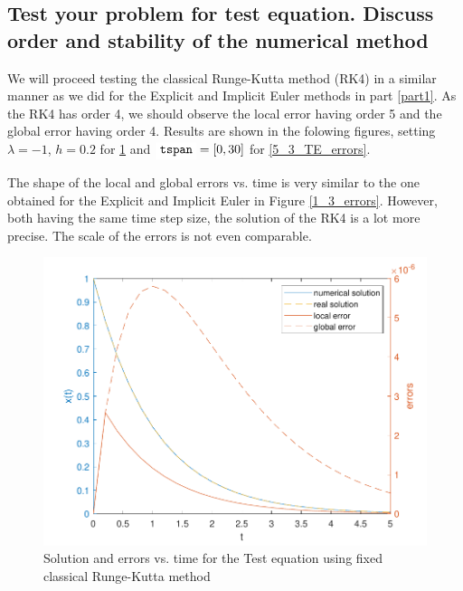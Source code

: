 \subsection{Test your problem for test equation. Discuss order and stability of the numerical method} \label{5_3}
We will proceed testing the classical Runge-Kutta method (RK4) in a similar manner as we did for the Explicit and Implicit Euler methods in part \ref{part1}. As the RK4 has order 4, we should observe the local error having order 5 and the global error having order 4. Results are shown in the folowing figures, setting $\lambda=-1$, $h=0.2$ for \ref{5_3_TE} and $\code{tspan}=[0, 30]$ for \ref{5_3_TE_errors}.

The shape of the local and global errors vs. time is very similar to the one obtained for the Explicit and Implicit Euler in Figure \ref{1_3_errors}. However, both having the same time step size, the solution of the RK4 is a lot more precise. The scale of the errors is not even comparable.

\begin{figure}[H]
    \centering
    \includegraphics[width=0.7\linewidth]{images/5/5_3_TestEquation.pdf} 
    \caption{Solution and errors vs. time for the Test equation using fixed classical Runge-Kutta method}
    \label{5_3_TE}
\end{figure}

